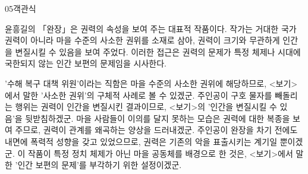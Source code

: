 \documentclass[fs85,seriesWit]{korfarm-base}
\begin{document}
\begin{kfQBlock}{05}{객관식}
\begin{kfEvidence}윤흥길의 「완장」은 권력의 속성을 보여 주는 대표적 작품이다. 작가는 거대한 국가 권력이 아니라 마을 수준의 사소한 권위를 소재로 삼아, 권력이 크기와 무관하게 인간을 변질시킬 수 있음을 보여 주었다. 이러한 접근은 권력의 문제가 특정 체제나 시대에 국한되지 않는 인간 보편의 문제임을 시사한다.\end{kfEvidence}
\begin{kfChoices}
\kfChoice '수해 복구 대책 위원'이라는 직함은 마을 수준의 사소한 권위에 해당하므로, <보기>에서 말한 '사소한 권위'의 구체적 사례로 볼 수 있겠군.
\kfChoice 주인공이 구호 물자를 빼돌리는 행위는 권력이 인간을 변질시킨 결과이므로, <보기>의 '인간을 변질시킬 수 있음'을 뒷받침하겠군.
\kfChoice 마을 사람들이 이의를 달지 못하는 모습은 권력에 대한 복종을 보여 주므로, 권력이 관계를 왜곡하는 양상을 드러내겠군.
\kfChoice 주인공이 완장을 차기 전에도 내면에 폭력적 성향을 갖고 있었으므로, 권력은 기존의 악을 표출시키는 계기일 뿐이겠군.
\kfChoice 이 작품이 특정 정치 체제가 아닌 마을 공동체를 배경으로 한 것은, <보기>에서 말한 '인간 보편의 문제'를 부각하기 위한 설정이겠군.
\end{kfChoices}
\end{kfQBlock}

\kfEndMC
\end{document}
